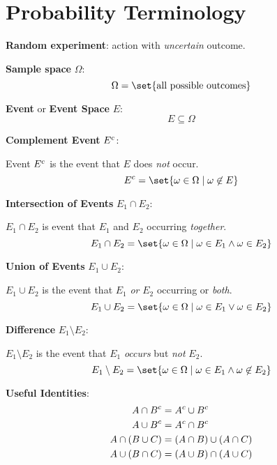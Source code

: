 \section*{Probability Terminology}

\textbf{Random experiment}: action with \textit{uncertain} outcome.

\textbf{Sample space} $\Omega$:
\begin{equation*}
    \Omega = \set{ \text{all possible outcomes} }
\end{equation*}

\textbf{Event} or \textbf{Event Space} $E$:
\begin{equation*}
    E \subseteq \Omega
\end{equation*}

\textbf{Complement Event} ${E}^{c}$:

Event ${E}^{c}$ is the event that $E$ does \textit{not} occur.
\begin{equation*}
    \AbsComplement{E} = \set{ \omega \in \Omega \given \omega \not\in E }
\end{equation*}

\textbf{Intersection of Events} $E_1 \cap E_2$:

$E_1 \cap E_2$ is event that $E_1$ and $E_2$ occurring \textit{together}.
\begin{equation*}
    E_1 \cap E_2 = \set{ \omega \in \Omega \given \omega \in E_1 \land \omega \in E_2 }
\end{equation*}

\textbf{Union of Events} $E_1 \cup E_2$:

$E_1 \cup E_2$ is the event that $E_1$ \textit{or} $E_2$ occurring or \textit{both}.
\begin{equation*}
    E_1 \cup E_2 = \set{ \omega \in \Omega \given \omega \in E_1 \lor \omega \in E_2 }
\end{equation*}

\textbf{Difference} $E_1 \setminus E_2$:

$E_1 \setminus E_2$ is the event that $E_1$ \textit{occurs} but \textit{not} $E_2$.
\begin{equation*}
    E_1 \setminus E_2 = \set{ \omega \in \Omega \given \omega \in E_1 \land \omega \not\in E_2 }
\end{equation*}

\textbf{Useful Identities}:
\begin{align*}
    {A \cap B}^{c} &= {A}^{c} \cup {B}^{c} \\
    {A \cup B}^{c} &= {A}^{c} \cap {B}^{c} \\
    A \cap (B \cup C) &= (A \cap B) \cup (A \cap C) \\
    A \cup (B \cap C) &= (A \cup B) \cap (A \cup C)
\end{align*}

